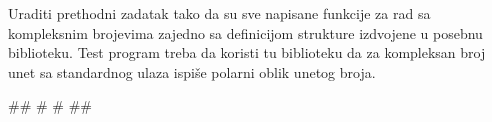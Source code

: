 \begin{Exercise}[label=002] %
Uraditi prethodni zadatak tako da su sve napisane funkcije za rad sa kompleksnim brojevima zajedno sa definicijom strukture  izdvojene u posebnu biblioteku. Test program treba da koristi tu biblioteku da za kompleksan broj unet sa standardnog ulaza ispiše polarni oblik unetog broja.

\begin{maxitest}
\begin{upotreba}{1}
#\naslovInt#
# #
##
\end{upotreba}
\end{maxitest}


\end{Exercise}
\begin{Answer}[ref=002]
\end{Answer}


